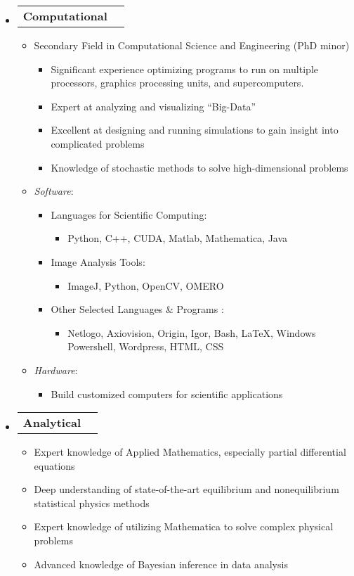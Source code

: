\documentclass[letterpaper,11pt]{article}
\makeatletter
\newcommand{\resitem}[1]{\item #1 \vspace{-2pt}}
\newcommand{\award}[2]{\vspace{-5pt}
\begin{tabular*}{7.0in}{l@{\extracolsep{\fill}}r}
		\textbf{#1} & #2 
\end{tabular*}\vspace{-8pt}}
\makeatother
\begin{document}
\begin{itemize}

\item \award{Computational}{}

\begin{itemize}

\resitem{Secondary Field in Computational Science and Engineering (PhD minor)}
	\begin{itemize}
	\resitem{Significant experience optimizing programs to run on multiple processors, graphics processing units, and supercomputers.}
	\resitem{Expert at analyzing and visualizing ``Big-Data''}
	\resitem{Excellent at designing and running simulations to gain insight into complicated problems}
	\resitem{Knowledge of stochastic methods to solve high-dimensional problems}
	\end{itemize}

\resitem{\textit{Software}:}

\begin{itemize}

	\resitem{Languages for Scientific Computing:} 
		\begin{itemize}
		\resitem{Python, C++, CUDA, Matlab, Mathematica, Java}
		\end{itemize}
		
	\resitem{Image Analysis Tools:}
		\begin{itemize}
		\resitem{ImageJ, Python, OpenCV, OMERO}
		\end{itemize}
	
	\resitem{Other Selected Languages \& Programs}:
		\begin{itemize}
		\resitem{Netlogo, Axiovision, Origin, Igor, Bash, \LaTeX, Windows Powershell, Wordpress, HTML, CSS}
		\end{itemize}
	
\end{itemize}

\resitem{\textit{Hardware}:} 
	\begin{itemize}
	\resitem{Build customized computers for scientific applications}
	\end{itemize}

\end{itemize}

\item \award{Analytical}{}
\begin{itemize}
	\resitem{Expert knowledge of Applied Mathematics, especially partial differential equations}
	\resitem{Deep understanding of state-of-the-art equilibrium and nonequilibrium statistical physics methods}
	\resitem{Expert knowledge of utilizing Mathematica to solve complex physical problems}
	\resitem{Advanced knowledge of Bayesian inference in data analysis}
\end{itemize}




\end{itemize}
\end{document}

